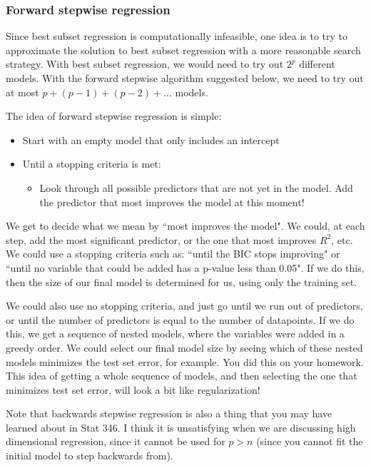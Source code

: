 \subsubsection{Forward stepwise regression}

Since best subset regression is computationally infeasible, one idea is to try to approximate the solution to best subset regression with a more reasonable  search strategy. With best subset regression, we would need to try out $2^p$ different models. With the forward stepwise algorithm suggested below, we need to try out at most $p+(p-1)+(p-2)+...$ models. 

The idea of forward stepwise regression is simple:
\begin{itemize}
\item Start with an empty model that only includes an intercept
\item Until a stopping criteria is met:
\begin{itemize}
\item Look through all possible predictors that are not yet in the model. Add the predictor that most improves the model at this moment! 
\end{itemize}	
\end{itemize}

We get to decide what we mean by ``most improves the model". We could, at each step, add the most significant predictor, or the one that most improves $R^2$, etc. We could use a stopping criteria such as: ``until the BIC stops improving" or ``until no variable that could be added has a p-value less than 0.05". If we do this, then the size of our final model is determined for us, using only the training set.

We could also use no stopping criteria, and just go until we run out of predictors, or until the number of predictors is equal to the number of datapoints. If we do this, we get a sequence of nested models, where the variables were added in a greedy order. We could select our final model size by seeing which of these nested models minimizes the test set error, for example. You did this on your homework. This idea of getting a whole sequence of models, and then selecting the one that minimizes test set error, will look a bit like regularization!

Note that backwards stepwise regression is also a thing that you may have learned about in Stat 346. I think it is unsatisfying when we are discussing high dimensional regression, since it cannot be used for $p > n$ (since you cannot fit the initial model to step backwards from). 

